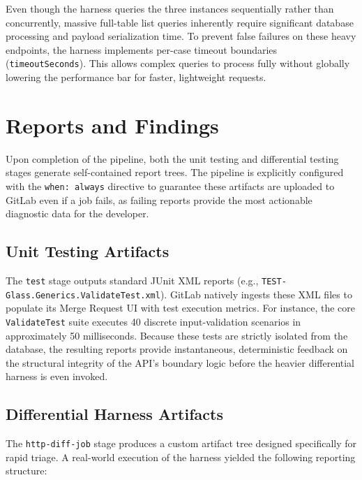 Even though the harness queries the three instances sequentially rather than
concurrently, massive full-table list queries inherently require
significant database processing and payload serialization time. To prevent false
failures on these heavy endpoints, the harness implements per-case timeout
boundaries (\texttt{timeoutSeconds}). This allows complex queries to
process fully without globally lowering the performance bar for faster, lightweight
requests.

\section{Reports and Findings}
\label{sec:reports}

Upon completion of the pipeline, both the unit testing and differential testing
stages generate self-contained report trees. The pipeline is explicitly
configured with the \texttt{when: always} directive to guarantee these artifacts
are uploaded to GitLab even if a job fails, as failing reports provide the
most actionable diagnostic data for the developer.

\subsection{Unit Testing Artifacts}
The \texttt{test} stage outputs standard JUnit \ac{XML} reports (e.g., \texttt{TEST-Glass.\allowbreak{}Generics.\allowbreak{}ValidateTest.xml}).
GitLab natively ingests these \ac{XML} files to populate its Merge Request \ac{UI}
with test execution metrics. For instance, the core \texttt{ValidateTest} suite
executes 40 discrete input-validation scenarios in approximately 50 milliseconds.
Because these tests are strictly isolated from the database, the resulting reports
provide instantaneous, deterministic feedback on the structural integrity
of the \ac{API}'s boundary logic before the heavier differential harness is even
invoked.

\subsection{Differential Harness Artifacts}
The \texttt{http-diff-job} stage produces a custom artifact tree designed
specifically for rapid triage. A real-world execution of the harness yielded
the following reporting structure:

